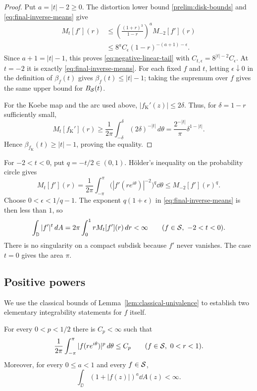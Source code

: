 \begin{proof}
Put $a=|t|-2\geq0$.  The distortion lower bound
\eqref{prelim:disk-bounds} and \eqref{eq:final-inverse-means} give
\[
 \begin{aligned}
 M_t[f'](r)
 &\leq\left(\frac{(1+r)^3}{1-r}\right)^a M_{-2}[f'](r)\\
 &\leq 8^a C_\epsilon(1-r)^{-(a+1)-\epsilon}.
 \end{aligned}
\]
Since $a+1=|t|-1$, this proves \eqref{eq:negative-linear-tail} with
$C_{t,\epsilon}=8^{|t|-2}C_\epsilon$.  At $t=-2$ it is exactly
\eqref{eq:final-inverse-means}.  For each fixed $f$ and $t$, letting
$\epsilon\downarrow0$ in the definition of $\beta_f(t)$ gives
$\beta_f(t)\leq|t|-1$; taking the supremum over $f$ gives the same
upper bound for $B_{\mathcal S}(t)$.

For the Koebe map and the arc used above, $|f_{\mathrm K}'(z)|\leq2\delta$.
Thus, for $\delta=1-r$ sufficiently small,
\[
 M_t[f_{\mathrm K}'](r)
 \geq\frac1{2\pi}\int_{-\delta}^{\delta}(2\delta)^{-|t|}\,d\theta
 =\frac{2^{-|t|}}{\pi}\delta^{1-|t|}.
\]
Hence $\beta_{f_{\mathrm K}}(t)\geq|t|-1$, proving the equality.
\end{proof}

For $-2<t<0$, put $q=-t/2\in(0,1)$.  H\"older's inequality on the
probability circle gives
\begin{equation}\label{eq:negative-holder}
 M_t[f'](r)
   =\frac1{2\pi}\int_{-\pi}^{\pi}
        \bigl(|f'(re^{i\theta})|^{-2}\bigr)^q\dd\theta
   \leq M_{-2}[f'](r)^q.
\end{equation}
Choose $0<\epsilon<1/q-1$.  The exponent $q(1+\epsilon)$ in
\eqref{eq:final-inverse-means} is then less than $1$, so
\begin{equation}\label{eq:negative-area}
 \int_{\mathbb D}|f'|^t\,d A
    =2\pi\int_0^1 r M_t[f'](r)\,d r<\infty
    \qquad(f\in\mathcal S,\ -2<t<0).
\end{equation}
There is no singularity on a compact subdisk because $f'$ never
vanishes.  The case $t=0$ gives the area $\pi$.

\subsection{Positive powers}

We use the classical bounds of Lemma~\ref{lem:classical-univalence}
to establish two elementary integrability statements for $f$ itself.

\begin{lemma}\label{lem:function-powers}
 For every $0<p<1/2$ there is $C_p<\infty$ such that
 \begin{equation}\label{eq:function-means}
  \frac1{2\pi}\int_{-\pi}^{\pi}
       |f(re^{i\theta})|^p\,d\theta\leq C_p
  \qquad(f\in\mathcal S,\ 0<r<1).
 \end{equation}
 Moreover, for every $0\leq a<1$ and every $f\in\mathcal S$,
 \begin{equation}\label{eq:function-area}
  \int_{\DD}(1+|f(z)|)^a\dd A(z)<\infty.
 \end{equation}
\end{lemma}

